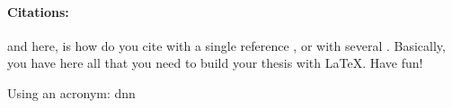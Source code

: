 \vspace{1cm} %

\paragraph{Citations:} and here, is how do you cite with a single reference \cite{harik1999compact}, or with several \cite{harik1999compact, goldberg1988genetic}. Basically, you have here all that you need to build your thesis with LaTeX. Have fun!

Using an acronym: \gls{dnn}
